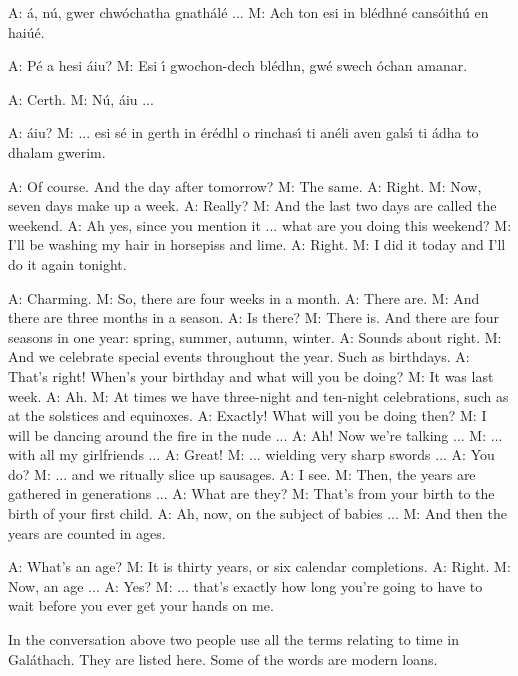 A: \'{a}, n\'{u}, gwer chw\'{o}chatha gnath\'{a}l\'{e} ...
M: Ach ton esi in bl\'{e}dhn\'{e} cans\'{o}ith\'{u} en hai\'{u}\'{e}.

A: P\'{e} a hesi \'{a}iu?
M: Esi \'{\i} gwochon-dech bl\'{e}dhn, gw\'{e} swech \'{o}chan amanar.

A: Certh.
M: N\'{u}, \'{a}iu ...

A: \'{a}iu?
M: ... esi s\'{e} in gerth in \'{e}r\'{e}dhl o rinchas\'{\i} ti an\'{e}li aven gals\'{\i} ti \'{a}dha to dhalam gwerim.

A: Of course. And the day after tomorrow?
M: The same.
A: Right.
M: Now, seven days make up a week.
A: Really?
M: And the last two days are called the weekend.
A: Ah yes, since you mention it ... what are you doing this weekend?
M: I’ll be washing my hair in horsepiss and lime.
A: Right.
M: I did it today and I’ll do it again tonight.

A: Charming.
M: So, there are four weeks in a month.
A: There are.
M: And there are three months in a season.
A: Is there?
M: There is. And there are four seasons in one year: spring, summer, autumn, winter.
A: Sounds about right.
M: And we celebrate special events throughout the year. Such as birthdays.
A: That’s right! When’s your birthday and what will you be doing?
M: It was last week.
A: Ah.
M: At times we have three-night and ten-night celebrations, such as at the solstices and equinoxes.
A: Exactly! What will you be doing then?
M: I will be dancing around the fire in the nude ...
A: Ah! Now we’re talking ...
M: ... with all my girlfriends ...
A: Great!
M: ... wielding very sharp swords ...
A: You do?
M: ... and we ritually slice up sausages.
A: I see.
M: Then, the years are gathered in generations ...
A: What are they?
M: That’s from your birth to the birth of your first child.
A: Ah, now, on the subject of babies ...
M: And then the years are counted in ages.

A: What’s an age?
M: It is thirty years, or six calendar completions.
A: Right.
M: Now, an age ...
A: Yes?
M: ... that’s exactly how long you’re going to have to wait before you ever get your hands on me.

In the conversation above two people use all the terms relating to time in Gal\'{a}thach. They are listed here. Some of the words are modern loans.

